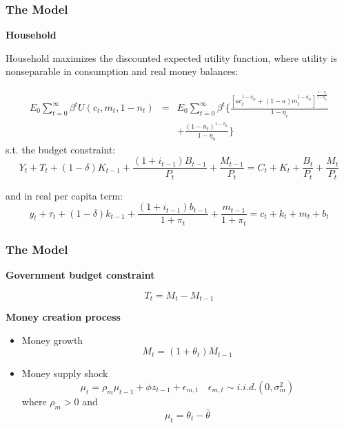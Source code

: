 \documentclass[handout]{beamer}
\begin{document}
\begin{frame}
\frametitle{The Model} 

\textbf{Household}

Household maximizes the discounted expected utility function, where
utility is nonseparable in consumption and real money balances:

{\scriptsize{
\begin{eqnarray}\label{Eq5.4}
E_{0}\sum_{t=0}^{\infty} \beta^{t} U(c_{t},m_{t},1-n_{t}) &=&
E_{0}\sum_{t=0}^{\infty} \beta^{t}
\bigl\{\frac{[ac_{t}^{1-\eta_{m}}+
(1-a)m_{t}^{1-\eta_{m}}]^{\frac{1-\eta_{c}}{1-\eta_{m}}}}{1-\eta_{c}}
\nonumber\\ && + \frac{(1-n_{t})^{1-\eta_{n}}}{1-\eta_{n}} \bigr\}
\end{eqnarray}}}
\pause s.t. the budget constraint:
\begin{equation}\label{Eq5.5}
Y_{t}+T_{t} + (1-\delta)K_{t-1} +\frac{(1+i_{t-1})B_{t-1}}{P_{t}} +
\frac{M_{t-1}}{P_{t}} = C_{t} + K_{t} + \frac{B_{t}}{P_{t}}  +
\frac{M_{t}}{P_{t}}
\end{equation}

and in real per capita term:
\begin{equation}\label{Eq5.6}
y_{t}+\tau_{t}+(1-\delta)k_{t-1}
+\frac{(1+i_{t-1})b_{t-1}}{1+\pi_{t}}
+\frac{m_{t-1}}{1+\pi_{t}}=c_{t}+k_{t}+m_{t}+b_{t}
\end{equation}

\end{frame}

\begin{frame}
\frametitle{The Model} 

\textbf{Government budget constraint}

\begin{equation}\label{Eq5.7}
T_{t}=M_{t}-M_{t-1}
\end{equation}

\textbf{Money creation process}
\begin{itemize}
\item Money growth
\begin{equation}\label{Eq5.8}
M_{t}=(1+\theta_{t})M_{t-1}
\end{equation}

\pause

\item Money supply shock
\begin{equation}\label{Eq5.9}
\mu_{t}=\rho_{m}\mu_{t-1}+\phi z_{t-1}+\epsilon_{m,t} \quad \epsilon_{m,t} \sim i.i.d.(0,\sigma_{m}^{2})
\end{equation}
where $\rho_{m}>0$ and 
\begin{equation}\label{Eq5.10}
\mu_{t}=\theta_{t}-\bar{\theta}
\end{equation}

\end{itemize}


\end{frame}
\end{document}
